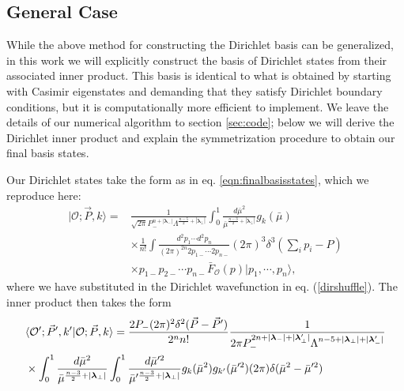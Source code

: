 \begin{subappendices}
\subsection{General Case \label{gencase}} 
While the above method for constructing the Dirichlet basis can be generalized, 
in this work we will explicitly construct the basis of Dirichlet states from 
their associated inner product. This basis is identical to what is obtained by 
starting with Casimir eigenstates and demanding that they satisfy Dirichlet 
boundary conditions, but it is computationally more efficient to implement. We 
leave the details of our numerical algorithm to section \ref{sec:code}; below we 
will derive the Dirichlet inner product and explain the symmetrization procedure 
to obtain our final basis states.

Our Dirichlet states take the form as in eq. \eqref{eqn:finalbasisstates}, which 
we reproduce here: 
\begin{equation}
    \begin{aligned}
        | \mathcal{O};  \vec{P}, k \rangle = &\frac{1}{\sqrt{2\pi} P_-^{n + |\boldsymbol{\lambda}_-|} \Lambda^{\frac{n-5}{2} + |\boldsymbol{\lambda}_\bot|}}\int_0^{1} \frac{d\bar{\mu}^2}{\bar{\mu}^{\frac{n-3}{2} + |\boldsymbol{\lambda}_\bot|}} g_k(\bar{\mu}) \label{eqn:finalbasisstates}\\
        &\times \frac{1}{n!}\int \frac{d^2 p_1 \dotsb d^2 p_n}{(2\pi)^{2n} 2p_{1-} \dotsb 2p_{n-}} (2\pi)^3 \delta^3 \left( \sum_i p_i - P \right) \\
        &\times p_{1-} p_{2-} \dotsb p_{n-} \bar{F}_{\mathcal{O}}(p) | p_1, \dotsb, p_n \rangle,
    \end{aligned}
\end{equation} 
where we have substituted in the Dirichlet wavefunction in eq. 
(\ref{dirshuffle}). The inner product then takes the form 
\begin{equation}
    \begin{aligned}
        &\inner{\mathcal{O}';\vec{P}', k'}{\mathcal{O};\vec{P}, k} = \frac{2P_- (2\pi)^2 \delta^2(\vec{P}-\vec{P}')}{2^n n!} \frac{1}{2\pi P_-^{2n+ |\boldsymbol{\lambda}_-|+|\boldsymbol{\lambda}^{\prime}_\bot|} \Lambda^{n-5 + |\boldsymbol{\lambda}_\bot|+|\boldsymbol{\lambda}^{\prime}_-|}} \\
        &\times \int_0^{1} \frac{d\bar{\mu}^2}{\bar{\mu}^{\frac{n-3}{2} + |\boldsymbol{\lambda}_\bot|}} \int_0^{1} \frac{d\bar{\mu}^{\prime 2}}{\bar{\mu}^{\prime \frac{n-3}{2} + |\boldsymbol{\lambda}_\bot|}} g_k(\bar{\mu}^2) g_{k'}(\bar{\mu}^{\prime 2}) (2\pi) \delta(\bar{\mu}^2 - \bar{\mu}^{\prime 2}) \\

\end{aligned}
\end{equation}
\end{subappendices}
